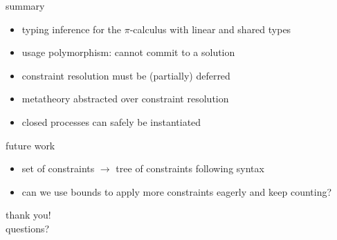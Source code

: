 \documentclass[dvipsnames]{beamer}
\newcommand{\sitem}{\item[\raisebox{.45ex}{\rule{.6ex}{.6ex}}]}
\theoremstyle{definition}\newtheorem{mytheorem}{Theorem}[section]
\newcommand{\picalc}{$\pi$-calculus}
\begin{document}
\begin{frame}{summary}
\begin{itemize}
\setlength\itemsep{1em}
\sitem typing inference for the \picalc{} with linear and shared types
\sitem usage polymorphism: cannot commit to a solution
\sitem constraint resolution must be (partially) deferred
\sitem metatheory abstracted over constraint resolution
\sitem closed processes can safely be instantiated 
\end{itemize}
\end{frame}

\begin{frame}{future work}
\begin{itemize}
\setlength\itemsep{1em}
\sitem set of constraints $\to$ tree of constraints following syntax
\sitem can we use bounds to apply more constraints eagerly and keep counting?
\end{itemize}
\end{frame}

\begin{frame}
  \centering
  \Huge{thank you!} \\
  \Huge{questions?}
\end{frame}



\end{document}
